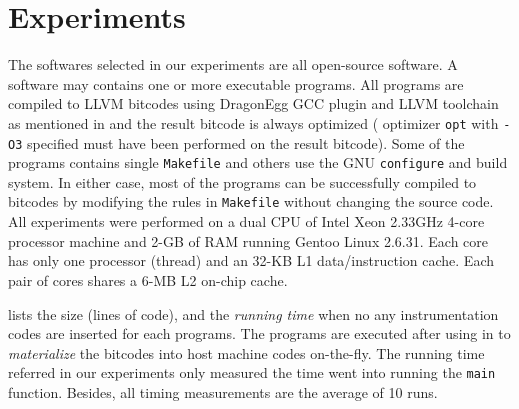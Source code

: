 \chapter{Experiments}
\label{c:experiments}

The softwares selected in our experiments are all open-source software. A software may contains one or more executable programs. All programs are compiled to LLVM bitcodes using DragonEgg GCC plugin and LLVM toolchain as mentioned in  and the result bitcode is always optimized (\ie{} optimizer \verb|opt| with \verb|-O3| specified must have been performed on the result bitcode). Some of the programs contains single \verb|Makefile| and others use the GNU \verb|configure| and build system. In either case, most of the programs can be successfully compiled to bitcodes by modifying the rules in \verb|Makefile| without changing the source code. All experiments were performed on a dual CPU of Intel Xeon 2.33GHz 4-core processor machine and 2-GB of RAM running Gentoo Linux 2.6.31. Each core has only one processor (thread) and an 32-KB L1 data/instruction cache. Each pair of cores shares a 6-MB L2 on-chip cache.

 lists the size (lines of code), and the \textit{running time} when no any instrumentation codes are inserted for each programs. The programs are executed after using \JIT{} in \ThreadTracer{} to \textit{materialize} the bitcodes into host machine codes on-the-fly. The running time referred in our experiments only measured the time went into running the \verb|main| function. Besides, all timing measurements are the average of 10 runs.

